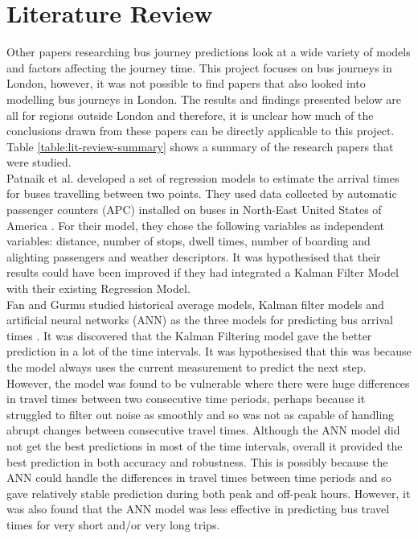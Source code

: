 \section{Literature Review}

Other papers researching bus journey predictions look at a wide variety of models and factors affecting the journey time. This project focuses on bus journeys in London, however, it was not possible to find papers that also looked into modelling bus journeys in London. The results and findings presented below are all for regions outside London and therefore, it is unclear how much of the conclusions drawn from these papers can be directly applicable to this project. Table \ref{table:lit-review-summary} shows a summary of the research papers that were studied. \\

Patnaik et al. developed a set of regression models to estimate the arrival times for buses travelling between two points. They used data collected by automatic passenger counters (APC) installed on buses in North-East United States of America \cite{apc-estimation}. For their model, they chose the following variables as independent variables: distance, number of stops, dwell times, number of boarding and alighting passengers and weather descriptors. It was hypothesised that their results could have been improved if they had integrated a Kalman Filter Model with their existing Regression Model. \\

Fan and Gurmu studied historical average models, Kalman filter models and artificial neural networks (ANN) as the three models for predicting bus arrival times \cite{dynamic-gps}. It was discovered that the Kalman Filtering model gave the better prediction in a lot of the time intervals. It was hypothesised that this was because the model always uses the current measurement to predict the next step. However, the model was found to be vulnerable where there were huge differences in travel times between two consecutive time periods, perhaps because it struggled to filter out noise as smoothly and so was not as capable of handling abrupt changes between consecutive travel times. Although the ANN model did not get the best predictions in most of the time intervals, overall it provided the best prediction in both accuracy and robustness. This is possibly because the ANN could handle the differences in travel times between time periods and so gave relatively stable prediction during both peak and off-peak hours. However, it was also found that the ANN model was less effective in predicting bus travel times for very short and/or very long trips. \\

